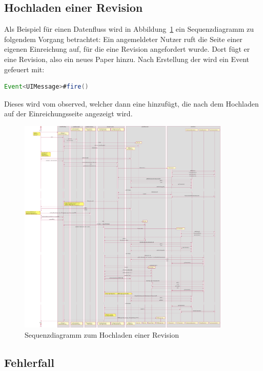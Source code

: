 
\subsection{Hochladen einer Revision}\label{subsec:sequenz-revision-hochladen}

Als Beispiel für einen Datenfluss wird in Abbildung~\ref{fig:upload-revision-sequence} ein Sequenzdiagramm zu folgendem Vorgang betrachtet:
Ein angemeldeter Nutzer ruft die Seite einer eigenen Einreichung auf, für die eine Revision angefordert wurde.
Dort fügt er eine Revision, also ein neues Paper hinzu.
Nach Erstellung der  wird ein Event gefeuert mit:
{\small
\begin{lstlisting}[language=Java]
    Event<UIMessage>#fire()
\end{lstlisting}
}
Dieses wird vom  observed, welcher dann eine  hinzufügt,
die nach dem Hochladen auf der Einreichungsseite angezeigt wird.

\begin{figure}[H]
    \centering
    \includegraphics[width=0.9\textwidth]{graphics/upload_revision}
    \caption{Sequenzdiagramm zum Hochladen einer Revision}
    \label{fig:upload-revision-sequence}
\end{figure}

\subsection{Fehlerfall}\label{subsec:fehlerfall}

